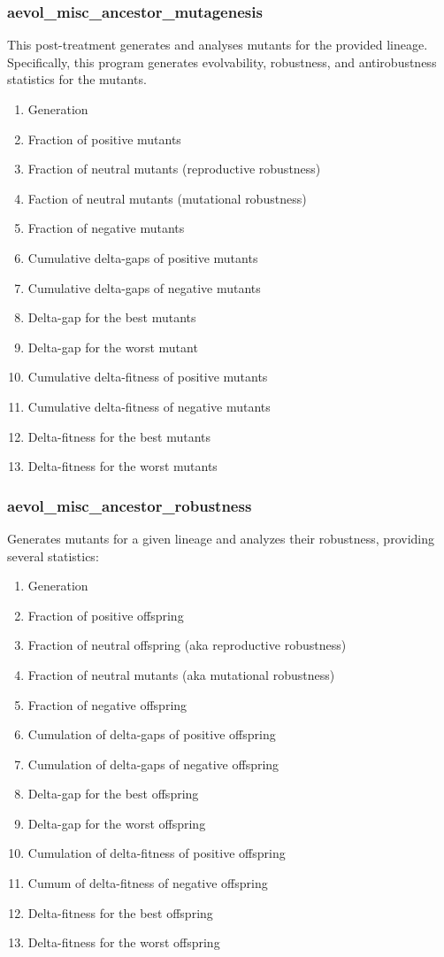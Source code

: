 \subsubsection{aevol\_misc\_ancestor\_mutagenesis}
This post-treatment generates and analyses mutants for the provided lineage. Specifically, this program generates evolvability, robustness, and antirobustness statistics for the mutants. 
\begin{enumerate}
	\item Generation
	\item Fraction of positive mutants
	\item Fraction of neutral mutants (reproductive robustness)
	\item Faction of neutral mutants (mutational robustness)
	\item Fraction of negative mutants
	\item Cumulative delta-gaps of positive mutants
	\item Cumulative delta-gaps of negative mutants
	\item Delta-gap for the best mutants
	\item Delta-gap for the worst mutant
	\item Cumulative delta-fitness of positive mutants
	\item Cumulative delta-fitness of negative mutants
	\item Delta-fitness for the best mutants
	\item Delta-fitness for the worst mutants
\end{enumerate}
\subsubsection{aevol\_misc\_ancestor\_robustness}
Generates mutants for a given lineage and analyzes their robustness, providing several statistics:
\begin{enumerate}
	
	\item Generation 
	\item Fraction of positive offspring 
	\item Fraction of neutral offspring (aka reproductive robustness) 
	\item Fraction of neutral mutants (aka mutational robustness) 
	\item Fraction of negative offspring 
	\item Cumulation of delta-gaps of positive offspring
	\item Cumulation of delta-gaps of negative offspring
	\item Delta-gap for the best offspring 
	\item Delta-gap for the worst offspring 
	\item Cumulation of delta-fitness of positive offspring 
	\item Cumum of delta-fitness of negative offspring
	\item Delta-fitness for the best offspring
	\item Delta-fitness for the worst offspring
\end{enumerate}


